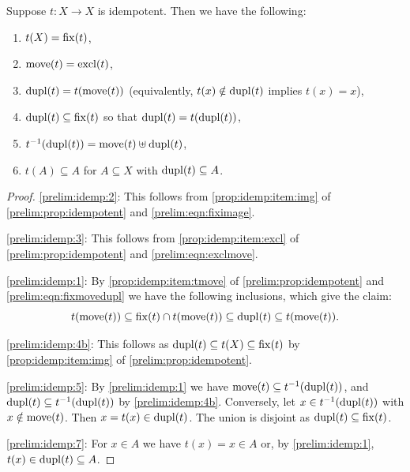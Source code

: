 \begin{corollary} \label{prelim:cor:idempotent}
	Suppose $t \colon X \to X$ is idempotent. Then we have the following:
	\begin{enumerate}
		\item \label{prelim:idemp:2} $t(X) = \operatorname{fix}(t)$,
		
		\item \label{prelim:idemp:3} $\operatorname{move}(t) = \operatorname{excl}(t)$,
		
		\item \label{prelim:idemp:1} $\operatorname{dupl}(t) = t(\operatorname{move}(t))$
		(equivalently, $t(x) \notin \operatorname{dupl}(t)$ implies $t(x) = x$),
		
		\item \label{prelim:idemp:4b} $\operatorname{dupl}(t)\subseteq \operatorname{fix}(t)$ so that $\operatorname{dupl}(t) = t(\operatorname{dupl}(t))$,
		
		\item \label{prelim:idemp:5} $t^{-1}(\operatorname{dupl}(t)) = \operatorname{move}(t) \uplus \operatorname{dupl}(t)$,
		
		\item \label{prelim:idemp:7} $t(A) \subseteq A$ for $A \subseteq X$ with $\operatorname{dupl}(t) \subseteq A$.
	\end{enumerate}
\end{corollary}
\begin{proof}
	\ref{prelim:idemp:2}: This follows from \cref{prop:idemp:item:img} of
	\cref{prelim:prop:idempotent} and \cref{prelim:eqn:fiximage}.
	
	\ref{prelim:idemp:3}: This follows from \cref{prop:idemp:item:excl} of
	\cref{prelim:prop:idempotent} and \cref{prelim:eqn:exclmove}.
	
	\ref{prelim:idemp:1}: By \cref{prop:idemp:item:tmove} of
	\cref{prelim:prop:idempotent} and \cref{prelim:eqn:fixmovedupl} we have the
	following inclusions, which give the claim:
	\[
	t(\operatorname{move}(t)) \subseteq \operatorname{fix}(t)\cap t(\operatorname{move}(t)) \subseteq \operatorname{dupl}(t) \subseteq t(\operatorname{move}(t)).
	\]
	
	\ref{prelim:idemp:4b}: This follows as
	$\operatorname{dupl}(t) \subseteq t(X) \subseteq \operatorname{fix}(t)$ by \cref{prop:idemp:item:img} of
	\cref{prelim:prop:idempotent}.
	
	\ref{prelim:idemp:5}: 
	By \cref{prelim:idemp:1} we have
	$\operatorname{move}(t) \subseteq t^{-1}(\operatorname{dupl}(t))$, and $\operatorname{dupl}(t) \subseteq t^{-1}(\operatorname{dupl}(t))$
	by \cref{prelim:idemp:4b}.
	Conversely, let $x \in t^{-1}(\operatorname{dupl}(t))$ with $x \notin \operatorname{move}(t)$.
	Then $x = t(x) \in \operatorname{dupl}(t)$.
	The union is disjoint as $\operatorname{dupl}(t) \subseteq \operatorname{fix}(t)$.

	\ref{prelim:idemp:7}: For $x \in A$ we have $t(x) = x \in A$ or, by
	\cref{prelim:idemp:1}, $t(x) \in \operatorname{dupl}(t) \subseteq A$.
\end{proof}

